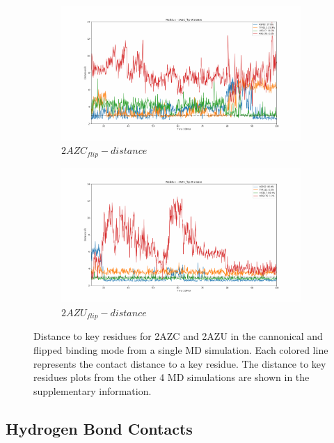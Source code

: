 \begin{figure}[!ht]
\begin{subfigure}{.45\textwidth}
     \centering
     \includegraphics[width=.95\linewidth]{chapter4/2AZC_flip/2AZC_flip-dist_3.pdf}
     \caption{$2AZC_{flip}-distance$}
     \label{fig:2AZC_flip-dist}
   \end{subfigure}
    \begin{subfigure}{.45\textwidth}
     \centering
     \includegraphics[width=.95\linewidth]{chapter4/2AZU_flip/2AZU_flip-dist_4.pdf}
     \caption{$2AZU_{flip}-distance$}
     \label{fig:2AZU_flip-dist}
   \end{subfigure}
\caption[Key residue distances for 2AZC/2AZU]{Distance to key residues for 2AZC and 2AZU in the cannonical and flipped binding mode from a single MD simulation. Each colored line represents the contact distance to a key residue. The distance to key residues plots from the other 4 MD simulations are shown in the supplementary information. }
\label{fig:contact-distance}
\end{figure}  

\subsection{Hydrogen Bond Contacts}

